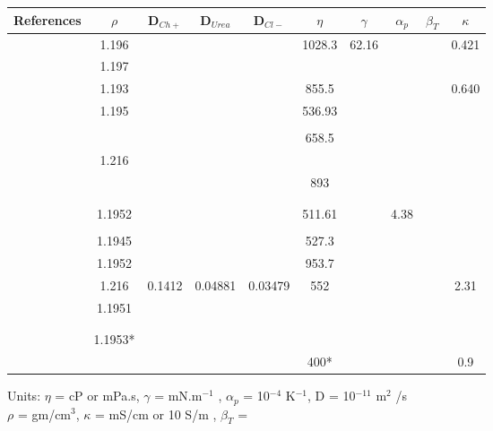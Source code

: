 \documentclass[11pt]{article}
\begin{document}
     \clearpage
      \clearpage
     \thispagestyle{empty}
     \begin{landscape}
          \centering
          \begin{tabular}{|c|c|c|c|c|c|c|c|c|c|}\hline
            References & $\rho$ & D$_{Ch+}$ & D$_{Urea}$ & D$_{Cl-}$& $\eta$ & $\gamma$  & $\alpha_{p}$ & $\beta_{T}$ & $\kappa$   \\ \hline
          \cite{Lapena2020}&1.196 & & & & 1028.3 &62.16 & & & 0.421  \\ \hline
          \cite{Gilmore2019}&1.197& & & & & & & & \\ \hline 
          \cite{Agieienko2019}& 1.193& & & & 855.5& & & & 0.640 \\ \hline
          \cite{Dhingra2019}&1.195 & & & &536.93 & & & & \\ \hline
          \cite{Komal2018}& & & & & & & & & \\ \hline
          \cite{Mirza2017}& & & & & 658.5& & & & \\ \hline
          \cite{Jabbar2017}&1.216 & & & & & & & & \\ \hline
          \cite{Dietz2017}& & & & & 893& & & & \\ \hline
          \cite{Mjalli2016_1}& & & & & & & & & \\ \hline
          \cite{Mjalli2016_2}& & & & & & & & & \\ \hline
          \cite{Chemat2016}&1.1952 & & & &511.61 & & 4.38 & & \\ \hline
          \cite{Mjalli2014}& & & & & & & & & \\ \hline
          \cite{Yadav2014}&1.1945 & & & &527.3 & & & & \\ \hline
          \cite{Xie2014}&1.1952 & & & &953.7 & & & &  \\ \hline
          \cite{Shah2014}&1.216 & 0.1412 &0.04881 & 0.03479 & 552 & & & & 2.31 \\ \hline
          \cite{Leron2012_1}& 1.1951 & & & & & & & & \\ \hline
          \cite{Leron2012_2}& & & & & & & & & \\ \hline
          \cite{D'Agostino2011}& & & & & & & & & \\ \hline
          \cite{Su2009}&1.1953* & & & & & & & & \\ \hline
          \cite{Abbott2003}& & & & &400* & & & &0.9 \\ \hline
          \end{tabular}
          Units: $\eta$ = cP or mPa.s, $\gamma$ = mN.m$^{-1}$ , $\alpha_{p}$  = 10$^{-4}$ K$^{-1}$, D = 10$^{-11}$ m$^{2}$ /s\\
          $\rho$ = gm/cm$^{3}$, $\kappa$ = mS/cm or 10 S/m , $\beta_{T}$ = 
     \end{landscape}
\end{document}
